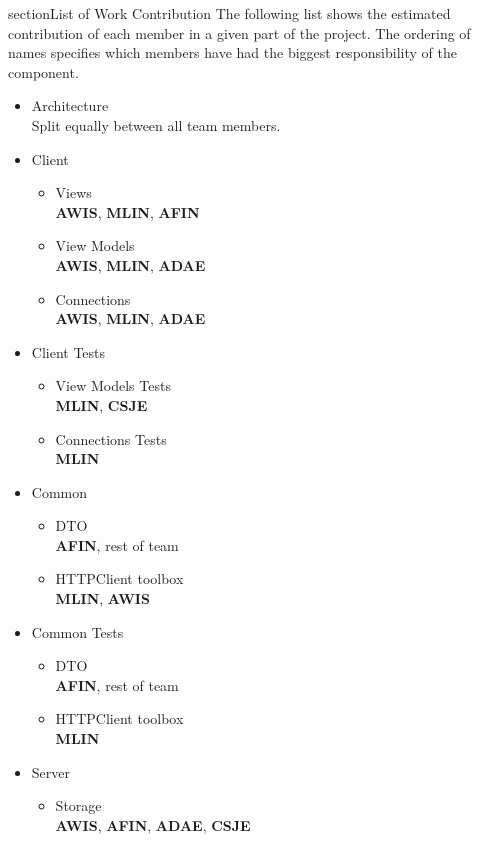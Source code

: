 section{List of Work Contribution}
The following list shows the estimated contribution of each member in a given part of the project. The ordering of names specifies which members have had the biggest responsibility of the component.

\begin{itemize}
	\item Architecture\\
	Split equally between all team members.
	\item Client
	\begin{itemize}
		\item Views\\
		\textbf{AWIS}, \textbf{MLIN}, \textbf{AFIN}
		\item View Models\\
		\textbf{AWIS}, \textbf{MLIN}, \textbf{ADAE}
		\item Connections\\
		\textbf{AWIS}, \textbf{MLIN}, \textbf{ADAE}
	\end{itemize}
	\item Client Tests
	\begin{itemize}
		\item View Models Tests\\
		\textbf{MLIN}, \textbf{CSJE}
		\item Connections Tests\\
		\textbf{MLIN}
	\end{itemize}
	\item Common
	\begin{itemize}
		\item DTO\\
		\textbf{AFIN}, rest of team
		\item HTTPClient toolbox\\
		\textbf{MLIN}, \textbf{AWIS}
	\end{itemize}
	\item Common Tests
	\begin{itemize}
		\item DTO\\
		\textbf{AFIN}, rest of team
		\item HTTPClient toolbox\\
		\textbf{MLIN}
	\end{itemize}
	\item Server
	\begin{itemize}
		\item Storage\\
		\textbf{AWIS}, \textbf{AFIN}, \textbf{ADAE}, \textbf{CSJE}

\end{itemize}
\end{itemize}
